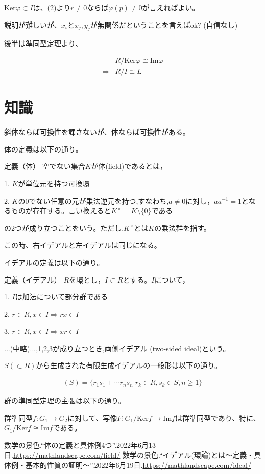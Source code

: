 \documentclass[a4paper, 10pt, dvipdfmx]{jlreq}
\begin{document}
$\mathrm{Ker}\varphi \subset I$は、(2)より$r\neq 0$ならば$\varphi(p) \neq 0$が言えればよい。

説明が難しいが、$x_i$と$x_j,y_j$が無関係だということを言えばok? (自信なし)

後半は準同型定理より、

\begin{align*}
                & R/\mathrm{Ker}{\varphi} \cong \mathrm{Im}{\varphi} \\
    \Rightarrow & R/I \cong L
\end{align*}

\section{知識}

斜体ならば可換性を課さないが、体ならば可換性がある。

体の定義は以下の通り。

\begin{itembox}[l]{ 定義（体）}
    空でない集合$K$が体(field)であるとは，

    1. $K$が単位元を持つ可換環

    2. $K$の0でない任意の元が乗法逆元を持つ,すなわち,$a \neq 0$に対し，$aa^{-1}=1$となるものが存在する。言い換えると$K^{\times}=K\setminus\{0\}$である

    の2つが成り立つことをいう。ただし,$K^{\times}$とは$K$の乗法群を指す。
\end{itembox}

この時、右イデアルと左イデアルは同じになる。

イデアルの定義は以下の通り。

\begin{itembox}[l]{ 定義（イデアル）}
    $R$を環とし，$I \subset R$とする。$I$について，

    1. $I$は加法について部分群である

    2. $r \in R, x \in I \Rightarrow rx \in I$

    3. $r \in R, x \in I \Rightarrow xr \in I$

    ...(中略)...,1,2,3が成り立つとき,両側イデアル (two-sided ideal)という。
\end{itembox}

$S (\subset R)$から生成された有限生成イデアルの一般形は以下の通り。

\begin{align*}
    (S)=\{r_1s_1+\cdots r_ns_n | r_k \in R, s_k \in S, n \geq 1 \}
\end{align*}

群の準同型定理の主張は以下の通り。

群準同型$f:G_1 \to G_2$に対して、写像$F:G_1/\mathrm{Ker}f \to \mathrm{Im}f$は群準同型であり、特に、$G_1/\mathrm{Ker}f \cong \mathrm{Im}f$である。


\begin{thebibliography}{9}
    数学の景色.“体の定義と具体例4つ”.2022年6月13日.\url{https://mathlandscape.com/field/}
    数学の景色.“イデアル(環論)とは～定義・具体例・基本的性質の証明～”.2022年6月19日.\url{https://mathlandscape.com/ideal/}
\end{thebibliography}
\end{document}
